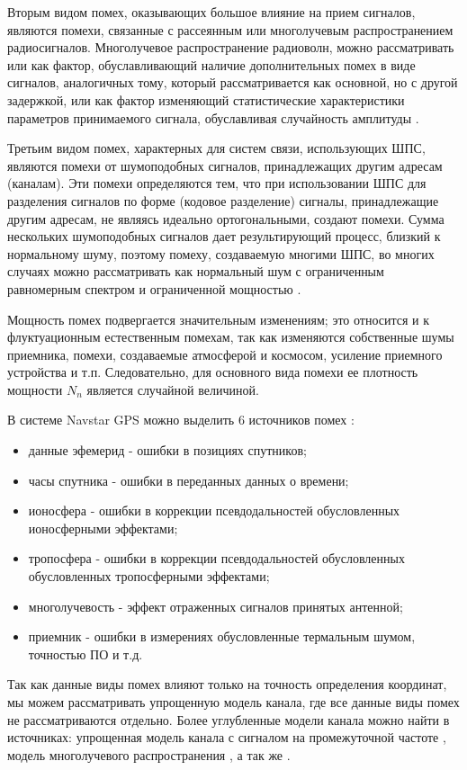 Вторым видом помех, оказывающих
большое влияние на прием сигналов, являются помехи, связанные с рассеянным или многолучевым распространением
радиосигналов. Многолучевое распространение радиоволн, можно рассматривать или как фактор, обуславливающий
наличие дополнительных помех в виде сигналов, аналогичных тому, который рассматривается как основной, но с другой
задержкой, или как фактор изменяющий статистические характеристики параметров принимаемого сигнала,
обуславливая случайность амплитуды \cite{pestryakov-book}.

Третьим видом помех, характерных для систем связи, использующих ШПС, являются помехи от шумоподобных сигналов,
принадлежащих другим адресам (каналам). Эти помехи определяются тем, что при использовании ШПС для разделения
сигналов по форме (кодовое разделение) сигналы, принадлежащие другим адресам, не являясь идеально ортогональными,
создают помехи. Сумма нескольких шумоподобных сигналов дает результирующий процесс, близкий к нормальному шуму,
поэтому помеху, создаваемую многими ШПС, во многих случаях можно рассматривать как нормальный шум с ограниченным
равномерным спектром и ограниченной мощностью \cite{pestryakov-book}.

Мощность помех подвергается значительным изменениям; это относится и к флуктуационным естественным помехам, так как
изменяются собственные шумы приемника, помехи, создаваемые атмосферой и космосом, усиление приемного устройства
и т.п. Следовательно, для основного вида помехи ее плотность мощности ${N_n}$ является случайной величиной.

В системе Navstar GPS можно выделить 6 источников помех \cite{parkinson_1996}:
\begin{itemize}
	\item {данные эфемерид - ошибки в позициях спутников;}
	\item {часы спутника - ошибки в переданных данных о времени;}
	\item {ионосфера - ошибки в коррекции псевдодальностей обусловленных ионосферными эффектами;}
	\item {тропосфера - ошибки в коррекции псевдодальностей обусловленных обусловленных тропосферными эффектами;}
	\item {многолучевость - эффект отраженных сигналов принятых антенной;}
	\item {приемник - ошибки в измерениях обусловленные термальным шумом, точностью ПО и т.д.}
\end{itemize}

Так как данные виды помех влияют только на точность определения координат, мы можем рассматривать упрощенную модель
канала, где все данные виды помех не рассматриваются отдельно. Более углубленные модели канала можно найти в
источниках: упрощенная модель канала с сигналом на промежуточной частоте \cite{lei_dong_phd}, модель многолучевого
распространения \cite{hannah_phd}, а так же \cite{burns_model, corbell_model, crs_model, brown_model}.

